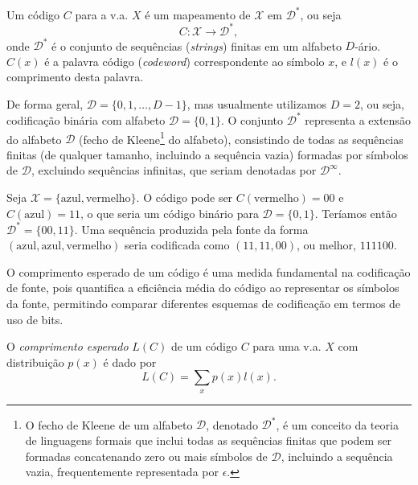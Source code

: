 \begin{definition}
Um código $C$ para a v.a. $X$ é um mapeamento de $\mathcal{X}$ em $\mathcal{D}^\ast$,
ou seja
\begin{equation}
  C: \mathcal{X} \rightarrow \mathcal{D}^\ast ,
\end{equation}
onde $\mathcal{D}^\ast$ é o conjunto
de sequências (\textit{strings}) finitas em um alfabeto $D$-ário. $C(x)$ é a palavra código
(\textit{codeword}) correspondente ao símbolo $x$, e $l(x)$ é o comprimento desta palavra.
\end{definition}
De forma geral, $\mathcal{D} = \{0,1, \ldots, D-1\}$, mas usualmente utilizamos $D=2$, ou seja,
codificação binária com alfabeto $\mathcal{D} = \{0,1\}$.
O conjunto $\mathcal{D}^\ast$ representa a extensão do alfabeto $\mathcal{D}$
(fecho de Kleene\footnote[][-1cm]{
  O fecho de Kleene de um alfabeto $\mathcal{D}$, denotado $\mathcal{D}^\ast$,
  é um conceito da teoria de linguagens formais que inclui todas as sequências
  finitas que podem ser formadas concatenando zero ou mais símbolos de $\mathcal{D}$,
  incluindo a sequência vazia, frequentemente representada por $\epsilon$.

} do alfabeto), consistindo de todas as sequências finitas (de qualquer tamanho,
incluindo a sequência vazia) formadas por símbolos de $\mathcal{D}$, excluindo
sequências infinitas, que seriam denotadas por $\mathcal{D}^\infty$.

\begin{example}
Seja $\mathcal{X} = \{\text{azul}, \text{vermelho}\}$. O código pode ser $C(\text{vermelho})=00$ e
$C(\text{azul})=11$, o que seria um código binário para $\mathcal{D} = \{0,1\}$.
Teríamos então $\mathcal{D}^\ast = \{ 00 , 11 \}$. Uma sequência produzida pela fonte da forma
$(\text{azul},\text{azul},\text{vermelho})$ seria codificada como $(11,11,00)$, ou melhor, $111100$.
\end{example}

O comprimento esperado de um código é uma medida fundamental na codificação de
fonte, pois quantifica a eficiência média do código ao representar os símbolos
da fonte, permitindo comparar diferentes esquemas de codificação em termos de
uso de bits.

\begin{definition}
  O \emph{comprimento esperado} $L(C)$ de um código $C$ para uma v.a. $X$ com distribuição $p(x)$ é dado por
\begin{equation}
  L(C) = \sum_x p(x) l(x) .
\end{equation}
\end{definition}


